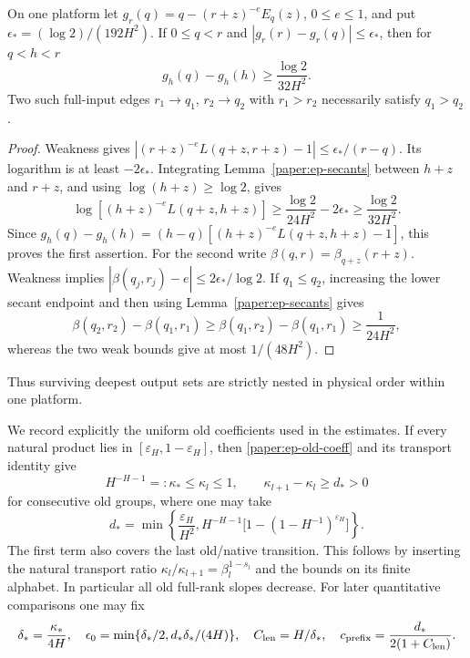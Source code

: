 \begin{lemma}\label{paper:ep-weak-order}
On one platform let $g_r(q)=q-(r+z)^{-e}E_q(z)$, $0\leq e\leq1$,
and put $\epsilon_*=(\log2)/(192H^2)$.
If $0\leq q<r$ and $|g_r(r)-g_r(q)|\leq\epsilon_*$, then for
$q<h<r$
\begin{equation}\label{paper:ep-intervening}
 g_h(q)-g_h(h)\geq\frac{\log2}{32H^2}.
\end{equation}
Two such full-input edges $r_1\to q_1$, $r_2\to q_2$ with
$r_1>r_2$ necessarily satisfy $q_1>q_2$.
\end{lemma}
\begin{proof}
Weakness gives
$|(r+z)^{-e}L(q+z,r+z)-1|\leq\epsilon_* /(r-q)$.
Its logarithm is at least $-2\epsilon_*$.  Integrating
Lemma~\ref{paper:ep-secants} between $h+z$ and $r+z$, and using
$\log(h+z)\geq\log2$, gives
\[
 \log[(h+z)^{-e}L(q+z,h+z)]
 \geq\frac{\log2}{24H^2}-2\epsilon_*
 \geq\frac{\log2}{32H^2}.
\]
Since $g_h(q)-g_h(h)=(h-q)[(h+z)^{-e}L(q+z,h+z)-1]$,
this proves the first assertion.
For the second write $\beta(q,r)=\beta_{q+z}(r+z)$.
Weakness implies $|\beta(q_j,r_j)-e|\leq2\epsilon_*/\log2$.
If $q_1\leq q_2$, increasing the lower secant endpoint and then using
Lemma~\ref{paper:ep-secants} gives
\[
 \beta(q_2,r_2)-\beta(q_1,r_1)
 \geq\beta(q_1,r_2)-\beta(q_1,r_1)\geq\frac1{24H^2},
\]
whereas the two weak bounds give at most $1/(48H^2)$.
\end{proof}
Thus surviving deepest output sets are strictly nested in physical
order within one platform.

We record explicitly the uniform old coefficients used in the estimates.
If every natural product lies in $[\varepsilon_H,1-\varepsilon_H]$,
then \eqref{paper:ep-old-coeff} and its transport identity give
\begin{equation}\label{paper:ep-old-uniform}
 H^{-H-1}=:\kappa_*\leq\kappa_l\leq1,
 \qquad \kappa_{l+1}-\kappa_l\geq d_*>0
\end{equation}
for consecutive old groups, where one may take
\[
 d_* =\min\left\{\frac{\varepsilon_H}{H^2},
 H^{-H-1}\big[1-(1-H^{-1})^{\varepsilon_H}\big]\right\}.
\]
The first term also covers the last old/native transition.  This follows
by inserting the natural transport ratio
$\kappa_l/\kappa_{l+1}=\beta_l^{1-s_l}$ and the bounds on its
finite alphabet.  In particular all old full-rank slopes decrease.
For later quantitative comparisons one may fix
\[
 \delta_*=\frac{\kappa_*}{4H},\quad
 \epsilon_0=\min\{\delta_*/2,d_*\delta_*/(4H)\},\quad
 C_{\rm len}=H/\delta_*,\quad
 c_{\rm prefix}=\frac{d_*}{2(1+C_{\rm len})}.
\]

